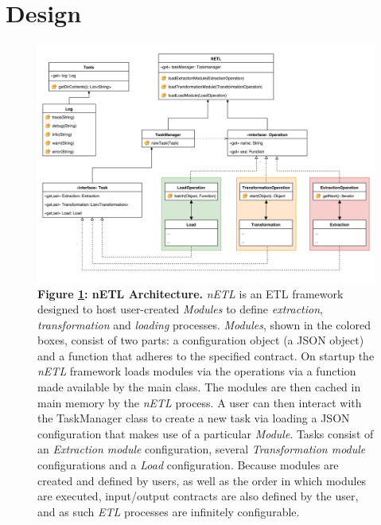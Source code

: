\section{Design}

\begin{figure}[H]
    \centering
    \begin{mdframed}
        \centering
        \includegraphics[scale=0.092]{./resources/figures/netlUML.png}
    \end{mdframed}
    \caption[nETL Architecture]{\textbf{Figure \ref{nETL}: nETL Architecture.} \textit{nETL} is an ETL framework designed to host user-created \textit{Modules} to define \textit{extraction}, \textit{transformation} and \textit{loading} processes. \textit{Modules}, shown in the colored boxes, consist of two parts: a configuration object (a JSON object) and a function that adheres to the specified contract. On startup the \textit{nETL} framework loads modules via the operations via a function made available by the main class. The modules are then cached in main memory by the \textit{nETL} process. A user can then interact with the TaskManager class to create a new task via loading a JSON configuration that makes use of a particular \textit{Module}. Tasks consist of an \textit{Extraction module} configuration, several \textit{Transformation module} configurations and a \textit{Load} configuration. Because modules are created and defined by users, as well as the order in which modules are executed, input/output contracts are also defined by the user, and as such \textit{ETL} processes are infinitely configurable.}
    \label{nETL}
\end{figure}


